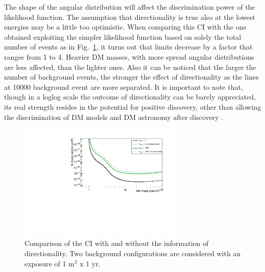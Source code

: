 \documentclass[physics,article,submit,moreauthors,pdftex]{Definitions/mdpi}
\begin{document}
The shape of the angular distribution will affect the discrimination power of the likelihood function. The assumption that directionality is true also at the lowest energies may be a little too optimistic. When comparing this CI with the one obtained exploiting the simpler likelihood function based on solely the total number of events as in Fig.~\ref{fig:nodir}, it turns out that limits decrease by a factor that ranges from 1 to 4. Heavier DM masses, with more spread angular distributions are less affected, than the lighter ones. Also it can be noticed that the larger the number of background events, the stronger the effect of directionality as the lines at 10000 background event are more separated. It is important to note that, though in a loglog scale the outcome of directionality can be barely appreciated, its real strength resides in the potential for positive discovery, other than allowing the discrimination of DM models and DM astronomy after discovery \cite{bib:Baracchini_2020}.
\begin{figure}[t]
\centering
 \includegraphics[width=0.7\textwidth]{Compare_directionality.pdf}
 \caption{Comparison of the CI with and without the information of directionality. Two background configurations are considered with an exposure of 1 m$^3$ x 1 yr.}
 \label{fig:nodir}
 \end{figure}
\end{document}
